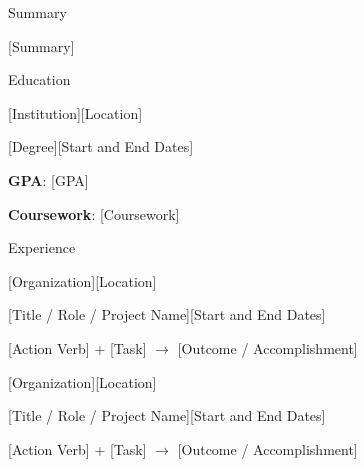 \documentclass{xsha}
\begin{document}
\address{
\textbf{Phone} [Phone Number] $\cdot$\space
\textbf{Email} [Email] $\cdot$\space
\textbf{LinkedIn} \href{https://linkedin.com/in/[LinkedIn Username]/}{in/[LinkedIn Username]}
}

\begin{xsection}{Summary}

\item {[Summary]}

\end{xsection}

\begin{xsection}{Education}

\begin{xheading1}{[Institution]}{[Location]}
\begin{xsubheading1}{[Degree]}{[Start and End Dates]}
\item \textbf{GPA}: [GPA]
\item \textbf{Coursework}: [Coursework]
\end{xsubheading1}
\end{xheading1}

\end{xsection}

\begin{xsection}{Experience}

\begin{xheading1}{[Organization]}{[Location]}
\begin{xsubheading1}{[Title / Role / Project Name]}{[Start and End Dates]}
\item {[Action Verb] + [Task] $\rightarrow$ [Outcome / Accomplishment]}
\end{xsubheading1}
\end{xheading1}

\begin{xheading1}{[Organization]}{[Location]}
\begin{xsubheading1}{[Title / Role / Project Name]}{[Start and End Dates]}
\item {[Action Verb] + [Task] $\rightarrow$ [Outcome / Accomplishment]}
\end{xsubheading1}
\end{xheading1}

\end{xsection}
\end{document}
